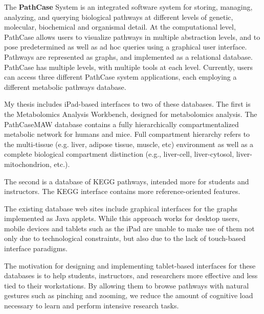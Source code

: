 The \textbf{PathCase} System is an integrated software system for storing,
managing, analyzing, and querying biological pathways at different levels of
genetic, molecular, biochemical and organismal detail. At the computational
level, PathCase allows users to visualize pathways in multiple abstraction
levels, and to pose predetermined as well as ad hoc queries using a graphical
user interface. Pathways are represented as graphs, and implemented as a
relational database. PathCase has multiple levels, with multiple tools at each
level. Currently, users can access three different PathCase system applications,
each employing a different metabolic pathways database.

My thesis includes iPad-based interfaces to two of these databases. The first is
the Metabolomics Analysis Workbench, designed for metabolomics analysis.  The
PathCaseMAW database contains a fully hierarchically compartmentalized metabolic
network for humans and mice. Full compartment hierarchy refers to the
multi-tissue (e.g.  liver, adipose tissue, muscle, etc) environment as well as a
complete biological compartment distinction (e.g., liver-cell, liver-cytosol,
liver-mitochondrion, etc.).

The second is a database of KEGG pathways, intended more for students and
instructors. The KEGG interface contains more reference-oriented features.

The existing database web sites include graphical interfaces for the graphs
implemented as Java applets. While this approach works for desktop users, mobile
devices and tablets such as the iPad are unable to make use of them not only due
to technological constraints, but also due to the lack of touch-based interface
paradigms.

The motivation for designing and implementing tablet-based interfaces for these
databases is to help students, instructors, and researchers more effective and
less tied to their workstations. By allowing them to browse pathways with
natural gestures such as pinching and zooming, we reduce the amount of cognitive
load necessary to learn and perform intensive research tasks.
